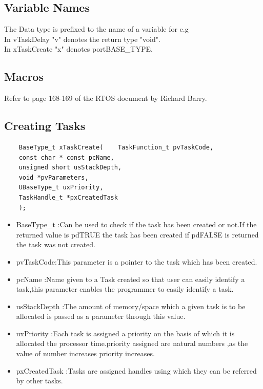 \documentclass[11pt,a4paper]{article}
\begin{document}
	\subsection{Variable Names}
	The Data type is prefixed to the name of a variable for e.g \\
	
	In vTaskDelay "v" denotes the return type "void".\\
	
	In xTaskCreate "x" denotes portBASE\_TYPE.
	
	\subsection{Macros}
	Refer to page 168-169 of the RTOS document by Richard Barry.
	
	\subsection{Creating Tasks}
	
	\begin{lstlisting}
	BaseType_t xTaskCreate(    TaskFunction_t pvTaskCode,
	const char * const pcName,
	unsigned short usStackDepth,
	void *pvParameters,
	UBaseType_t uxPriority,
	TaskHandle_t *pxCreatedTask
	);
	\end{lstlisting}
	
	\begin{itemize}
		\item BaseType\_t :Can be used to check if the task has been created or not.If the returned value is pdTRUE the task has been created if pdFALSE is returned the task was not created.
		
		\item  pvTaskCode:This parameter is a pointer to the task which has been created.
		
		\item pcName :Name given to a Task created so that user can easily identify a task,this parameter enables the programmer to easily identify a task.
		
		\item usStackDepth :The amount of memory/space which a given task is to be allocated is passed as a parameter through this value.
		
		\item uxPriority :Each task is assigned a priority on the basis of which it is allocated the processor time.priority assigned are natural numbers ,as the value of number increases priority increases.
		
		\item pxCreatedTask :Tasks are assigned handles using which they can be referred by other tasks. 
	\end{itemize}
	 
\end{document}
